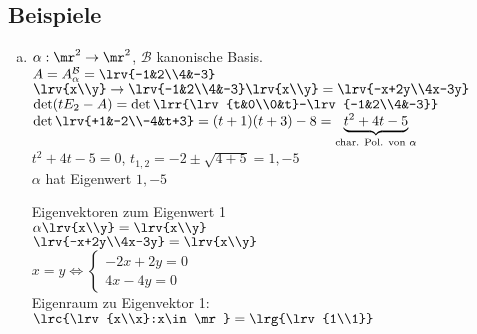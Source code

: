 \subsection{Beispiele}
  \begin{enumerate}[a)]
    \item $\alpha:\mr^2\rightarrow\mr^2$, $\mathcal{B}$ kanonische Basis.\\
      $A=A_\alpha^{\mathcal{B}}=\lrv{-1&2\\4&-3}$\\
      $\lrv{x\\y}\rightarrow\lrv{-1&2\\4&-3}\lrv{x\\y}=\lrv{-x+2y\\4x-3y}$\\
      $\det(tE_2-A)=\det\lrr{\lrv{t&0\\0&t}-\lrv{-1&2\\4&-3}}$\\
      $\det\lrv{+1&-2\\-4&t+3}=(t+1)(t+3)-8=\underbrace{t^2+4t-5}_{\mbox{\scriptsize
        char. Pol. von }\alpha}$\\
      $t^2+4t-5=0$, $t_{1,2}=-2\pm\sqrt{4+5}=1,-5$\\
      $\alpha$ hat Eigenwert $1,-5$

      Eigenvektoren zum Eigenwert 1\\
      $\alpha\lrv{x\\y}=\lrv{x\\y}$\\
      $\lrv{-x+2y\\4x-3y}=\lrv{x\\y}$\\
      $x=y\Leftrightarrow\begin{cases}-2x+2y=0\\4x-4y=0\end{cases}$\\
      Eigenraum zu Eigenvektor 1: $\lrc{\lrv{x\\x}:x\in\mr}=\lrg{\lrv{1\\1}}$


\end{enumerate}
